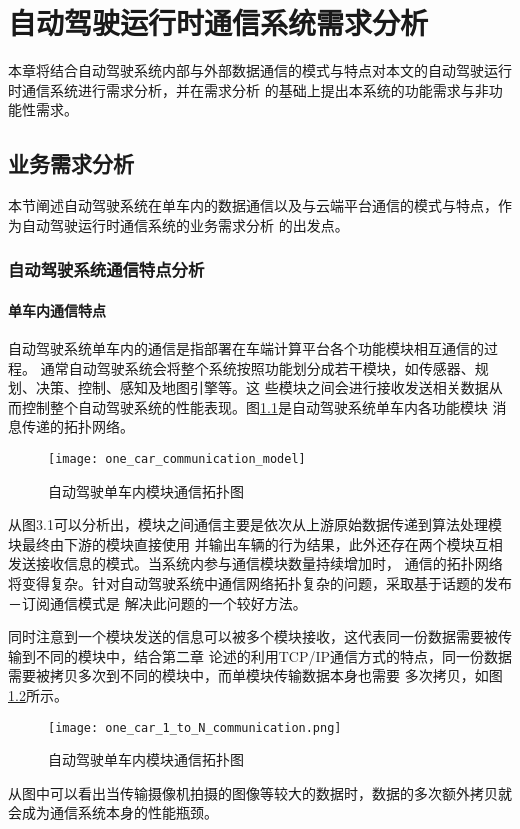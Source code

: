 \chapter{自动驾驶运行时通信系统需求分析}
本章将结合自动驾驶系统内部与外部数据通信的模式与特点对本文的自动驾驶运行时通信系统进行需求分析，并在需求分析
的基础上提出本系统的功能需求与非功能性需求。
\section{业务需求分析}
本节阐述自动驾驶系统在单车内的数据通信以及与云端平台通信的模式与特点，作为自动驾驶运行时通信系统的业务需求分析
的出发点。
\subsection{自动驾驶系统通信特点分析}
\subsubsection{单车内通信特点}
自动驾驶系统单车内的通信是指部署在车端计算平台各个功能模块相互通信的过程。
通常自动驾驶系统会将整个系统按照功能划分成若干模块，如传感器、规划、决策、控制、感知及地图引擎等。这
些模块之间会进行接收发送相关数据从而控制整个自动驾驶系统的性能表现。图\ref{one_car_communication_model}是自动驾驶系统单车内各功能模块
消息传递的拓扑网络。
\begin{figure}[H]
  \centering
  \texttt{[image: one\_car\_communication\_model]}
  \caption{自动驾驶单车内模块通信拓扑图}
  \label{one_car_communication_model}
\end{figure}
从图3.1可以分析出，模块之间通信主要是依次从上游原始数据传递到算法处理模块最终由下游的模块直接使用
并输出车辆的行为结果，此外还存在两个模块互相发送接收信息的模式。当系统内参与通信模块数量持续增加时，
通信的拓扑网络将变得复杂。针对自动驾驶系统中通信网络拓扑复杂的问题，采取基于话题的发布－订阅通信模式是
解决此问题的一个较好方法。

同时注意到一个模块发送的信息可以被多个模块接收，这代表同一份数据需要被传输到不同的模块中，结合第二章
论述的利用TCP/IP通信方式的特点，同一份数据需要被拷贝多次到不同的模块中，而单模块传输数据本身也需要
多次拷贝，如图\ref{one_car_1_to_N_communication}所示。
\begin{figure}[H]
  \centering
  \texttt{[image: one\_car\_1\_to\_N\_communication.png]}
  \caption{自动驾驶单车内模块通信拓扑图}
  \label{one_car_1_to_N_communication}
\end{figure}
从图中可以看出当传输摄像机拍摄的图像等较大的数据时，数据的多次额外拷贝就会成为通信系统本身的性能瓶颈。
